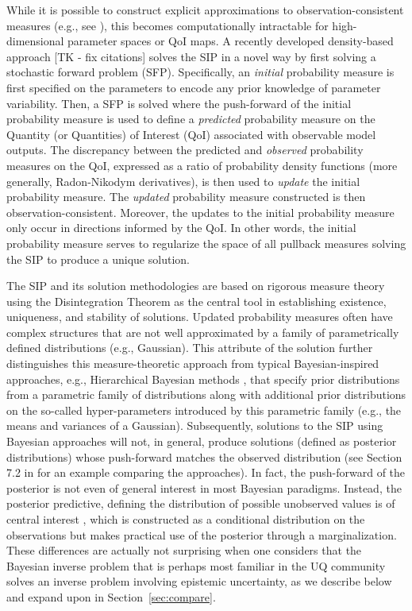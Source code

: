 While it is possible to construct explicit approximations to observation-consistent measures (e.g., see \cite{BET+14}), this becomes computationally intractable for high-dimensional parameter spaces or QoI maps.
A recently developed density-based approach [TK - fix citations]\cite{BJW18a, BJW18b, BWY20} solves the SIP in a novel way by first solving a stochastic forward problem (SFP).
Specifically, an {\em initial} probability measure is first specified on the parameters to encode any prior knowledge of parameter variability.
Then, a SFP is solved where the push-forward of the initial probability measure is used to define a {\em predicted} probability measure on the Quantity (or Quantities) of Interest (QoI) associated with observable model outputs.
The discrepancy between the predicted and {\em observed} probability measures on the QoI, expressed as a ratio of probability density functions (more generally, Radon-Nikodym derivatives), is then used to {\em update} the initial probability measure.
The {\em updated} probability measure constructed is then observation-consistent.
Moreover, the updates to the initial probability measure only occur in directions informed by the QoI.
In other words, the initial probability measure serves to regularize the space of all pullback measures solving the SIP to produce a unique solution.

The SIP and its solution methodologies are based on rigorous measure theory using the Disintegration Theorem \cite{Dellacherie_Meyer_book} as the central tool in establishing existence, uniqueness, and stability of solutions.
Updated probability measures often have complex structures that are not well approximated by a family of parametrically defined distributions (e.g., Gaussian).
This attribute of the solution further distinguishes this measure-theoretic approach from typical Bayesian-inspired approaches, e.g., Hierarchical Bayesian methods \cite{Smith, Tarantola_book}, that specify prior distributions from a parametric family of distributions along with additional prior distributions on the so-called hyper-parameters introduced by this parametric family (e.g., the means and variances of a Gaussian).
Subsequently, solutions to the SIP using Bayesian approaches will not, in general, produce solutions (defined as posterior distributions) whose push-forward matches the observed distribution (see Section 7.2 in \cite{BJW18a} for an example comparing the approaches).
In fact, the push-forward of the posterior is not even of general interest in most Bayesian paradigms.
Instead, the posterior predictive, defining the distribution of possible unobserved values is of central interest \cite{Smith}, which is constructed as a conditional distribution on the observations but makes practical use of the posterior through a marginalization.
These differences are actually not surprising when one considers that the Bayesian inverse problem that is perhaps most familiar in the UQ community solves an inverse problem involving epistemic uncertainty, as we describe below and expand upon in Section~\ref{sec:compare}.

